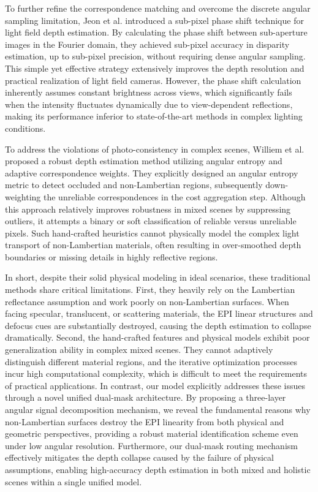 \documentclass[lettersize,journal]{IEEEtran}
\begin{document}
To further refine the correspondence matching and overcome the discrete angular sampling limitation, Jeon et al. \cite{jeonsubp} introduced a sub-pixel phase shift technique for light field depth estimation. By calculating the phase shift between sub-aperture images in the Fourier domain, they achieved sub-pixel accuracy in disparity estimation, up to sub-pixel precision, without requiring dense angular sampling. This simple yet effective strategy extensively improves the depth resolution and practical realization of light field cameras. However, the phase shift calculation inherently assumes constant brightness across views, which significantly fails when the intensity fluctuates dynamically due to view-dependent reflections, making its performance inferior to state-of-the-art methods in complex lighting conditions.

To address the violations of photo-consistency in complex scenes, Williem et al. \cite{willieangu} proposed a robust depth estimation method utilizing angular entropy and adaptive correspondence weights. They explicitly designed an angular entropy metric to detect occluded and non-Lambertian regions, subsequently down-weighting the unreliable correspondences in the cost aggregation step. Although this approach relatively improves robustness in mixed scenes by suppressing outliers, it attempts a binary or soft classification of reliable versus unreliable pixels. Such hand-crafted heuristics cannot physically model the complex light transport of non-Lambertian materials, often resulting in over-smoothed depth boundaries or missing details in highly reflective regions.

In short, despite their solid physical modeling in ideal scenarios, these traditional methods share critical limitations. First, they heavily rely on the Lambertian reflectance assumption and work poorly on non-Lambertian surfaces. When facing specular, translucent, or scattering materials, the EPI linear structures and defocus cues are substantially destroyed, causing the depth estimation to collapse dramatically. Second, the hand-crafted features and physical models exhibit poor generalization ability in complex mixed scenes. They cannot adaptively distinguish different material regions, and the iterative optimization processes incur high computational complexity, which is difficult to meet the requirements of practical applications. In contrast, our model explicitly addresses these issues through a novel unified dual-mask architecture. By proposing a three-layer angular signal decomposition mechanism, we reveal the fundamental reasons why non-Lambertian surfaces destroy the EPI linearity from both physical and geometric perspectives, providing a robust material identification scheme even under low angular resolution. Furthermore, our dual-mask routing mechanism effectively mitigates the depth collapse caused by the failure of physical assumptions, enabling high-accuracy depth estimation in both mixed and holistic scenes within a single unified model.
\end{document}
